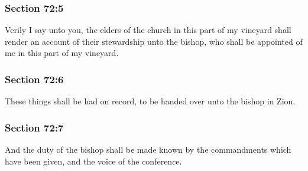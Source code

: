 	\subsubsection{Section 72:5} %
		\label{DC72-5}

		Verily I say unto you, the elders of the church in this part of my vineyard shall render an account of their stewardship unto the bishop, who shall be appointed of me in this part of my vineyard.


	\subsubsection{Section 72:6} %
		\label{DC72-6}

		These things shall be had on record, to be handed over unto the bishop in Zion.


	\subsubsection{Section 72:7} %
		\label{DC72-7}

		And the duty of the bishop shall be made known by the commandments which have been given, and the voice of the conference.


